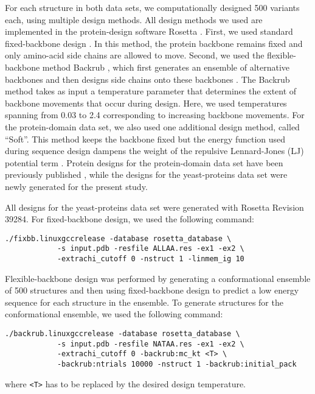 \documentclass[12pt]{article}
\begin{document}
For each structure in both data sets, we computationally designed 500 variants each, using multiple design methods. All design methods we used are implemented in the protein-design software Rosetta \citep{LeaverFayetal2011}. First, we used standard fixed-backbone design \citep{Kuhlman2003}. In this method, the protein backbone remains fixed and only amino-acid side chains are allowed to move. Second, we used the flexible-backbone method Backrub \citep{Smith2008}, which first generates an ensemble of alternative backbones and then designs side chains onto these backbones \citep{Friedland2009, Smith2010}. The Backrub method takes as input a temperature parameter that determines the extent of backbone movements that occur during design. Here, we used temperatures spanning from 0.03 to 2.4 corresponding to increasing backbone movements. For the protein-domain data set, we also used one additional design method, called ``Soft''. This method keeps the backbone fixed but the energy function used during sequence design dampens the weight of the repulsive Lennard-Jones (LJ) potential term \citep{OllikainenKortemme}.  Protein designs for the protein-domain data set have been previously published \citep{OllikainenKortemme}, while the designs for the yeast-proteins data set were newly generated for the present study.

\color{blue}
All designs for the yeast-proteins data set were generated with Rosetta Revision 39284. For fixed-backbone design, we used the following command:
\begin{verbatim}
./fixbb.linuxgccrelease -database rosetta_database \
            -s input.pdb -resfile ALLAA.res -ex1 -ex2 \
            -extrachi_cutoff 0 -nstruct 1 -linmem_ig 10
\end{verbatim}

\noindent Flexible-backbone design was performed by generating a conformational ensemble of 500 structures and then using fixed-backbone design to predict a low energy sequence for each structure in the ensemble. To generate structures for the conformational ensemble, we used the following command:
\begin{verbatim}
./backrub.linuxgccrelease -database rosetta_database \
            -s input.pdb -resfile NATAA.res -ex1 -ex2 \
            -extrachi_cutoff 0 -backrub:mc_kt <T> \
            -backrub:ntrials 10000 -nstruct 1 -backrub:initial_pack
\end{verbatim}
\noindent where \texttt{<T>} has to be replaced by the desired design temperature.
\end{document}
